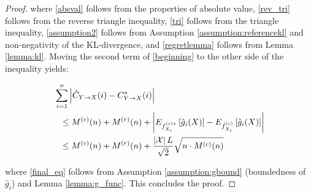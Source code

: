 \begin{proof}
\noindent where \eqref{absval} follows from the properties of absolute value, \eqref{rev_tri} follows from the reverse triangle inequality, \eqref{tri} follows from the triangle inequality, \eqref{assumption2} follows from Assumption \ref{assumption:referencekl} and non-negativity of the KL-divergence, and \eqref{regretlemma} follows from Lemma \ref{lemma:kl}. Moving the second term of \eqref{beginning} to the other side of the inequality yields:

\begin{align}
&\sum_{i=1}^n \left| \estcyx(i) - \optcyx(i) \right| \nonumber \\
& \ \ \le M^{(c)}(n) + M^{(r)}(n) + \left|
E_{\optfxc{i}}\left[ \hat{g}_i(X)\right] -
E_{\estfxc{i}}\left[ \hat{g}_i(X)\right]
\right| \nonumber \\
& \ \ \le M^{(c)}(n) + M^{(r)}(n) +
\frac{\left|\mc{X}\right|L}{\sqrt{2}}\sqrt{n \cdot M^{(c)}(n)}
\label{final_eq}
\end{align}

\noindent where \eqref{final_eq} follows from Assumption \ref{assumption:gbound} (boundedness of $\hat{g}_i$) and Lemma \ref{lemma:g_func}. This concludes the proof.

\end{proof}

